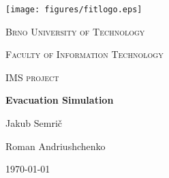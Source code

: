 \documentclass[english]{article}
\begin{document}
\begin{titlepage}
\centering
\texttt{[image: figures/fitlogo.eps]}\par\vspace{1cm}
{\scshape\LARGE Brno University of Technology\par}
\vspace{0.25cm}
{\scshape\LARGE Faculty of Information Technology\par}
\vspace{1cm}
{\scshape\Large IMS project\par}
\vspace{1.5cm}
{\Huge\bfseries Evacuation Simulation\par}
\vspace{2cm}
{\Large Jakub Semrič\par}
{\Large Roman Andriushchenko\par}
\vfill
{\large\today\par}
\end{titlepage}


\newpage

\makeatletter
\def\@openbib@code{\addcontentsline{toc}{chapter}{Bibliography}}
\makeatother





\end{document}
